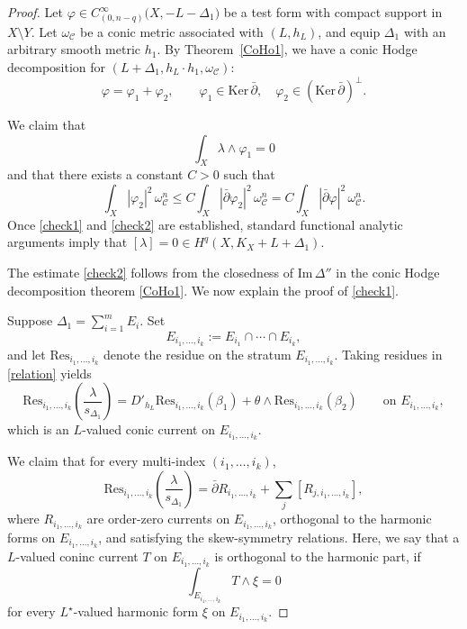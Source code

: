 \documentclass[english]{amsart}
\newcommand{\cC}{\mathcal{C}}
\newcommand{\im}{\mathrm{Im} \,}
\renewcommand{\ker}{\mathrm{Ker} \,}
\renewcommand{\le}{\leqslant}
\newcommand{\Res}{\mathrm{Res}}
\newcommand{\dbar}{\bar \partial}
\numberwithin{equation}{thm}
\begin{document}
			\begin{proof}
				Let $\varphi \in C^\infty_{(0,n-q)}\bigl(X,-L-\Delta_1\bigr)$ be a test form with compact support in $X\setminus Y$.
				Let $\omega_{\cC}$ be a conic metric associated with $(L,h_L)$, and equip $\Delta_1$ with an arbitrary smooth metric $h_1$.
				By Theorem~\ref{CoHo1}, we have a conic Hodge decomposition for $(L+\Delta_1, h_L\cdot h_1,\omega_{\cC})$:
				\begin{equation}\label{van3}
					\varphi=\varphi_1+\varphi_2,
					\qquad \varphi_1\in \ker \dbar,\quad \varphi_2\in (\ker \dbar)^\perp.
				\end{equation}
				
				\medskip
				
				We claim that
				\begin{equation}\label{check1}
					\int_X \lambda\wedge \varphi_1 = 0
				\end{equation}
				and that there exists a constant $C>0$ such that
				\begin{equation}\label{check2}
					\int_X |\varphi_2|^2 \,\omega_{\cC}^n
					\le C \int_X |\dbar \varphi_2|^2\,\omega_{\cC}^n
					= C \int_X |\dbar \varphi|^2\,\omega_{\cC}^n.
				\end{equation}
				Once \eqref{check1} and \eqref{check2} are established, standard functional analytic arguments imply that $[\lambda]=0 \in H^q(X,K_X+L+\Delta_1)$.
				
				\medskip
				
				The estimate \eqref{check2} follows from the closedness of $\im \Delta''$ in the conic Hodge decomposition theorem \ref{CoHo1}. 
				We now explain the proof of \eqref{check1}.
				
				Suppose $\Delta_1=\sum_{i=1}^m E_i$. Set
				\[
				E_{i_1,\dots,i_k}:=E_{i_1}\cap\cdots\cap E_{i_k},
				\]
				and let $\Res_{i_1,\dots,i_k}$ denote the residue on the stratum $E_{i_1,\dots,i_k}$.
				Taking residues in \eqref{relation} yields
				\begin{equation}\label{resiequl}
				\Res_{i_1,\dots,i_k}\!\left(\frac{\lambda}{s_{\Delta_1}}\right)
				= D'_{h_L}\Res_{i_1,\dots,i_k}(\beta_1)
				+ \theta \wedge \Res_{i_1,\dots,i_k}(\beta_2)
				\qquad \text{on } E_{i_1,\dots,i_k},
				\end{equation}
				which is an $L$-valued conic current on $E_{i_1,\dots,i_k}$.
				
				We claim that for every multi-index $(i_1,\dots,i_k)$,
				\begin{equation}\label{clima}
					\Res_{i_1,\dots,i_k}\!\left(\frac{\lambda}{s_{\Delta_1}}\right)
					= \dbar R_{i_1,\dots,i_k} + \sum_j [R_{j,i_1,\dots,i_k}],
				\end{equation}
				where $R_{i_1,\dots,i_k}$ are order-zero currents on $E_{i_1,\dots,i_k}$, orthogonal to the harmonic forms on $E_{i_1,\dots,i_k}$, and satisfying the skew-symmetry relations.  Here, we say that a $L$-valued coninc current $T$ on $E_{i_1,\dots,i_k}$ is orthogonal to the harmonic part, if 
				$$\int_{E_{i_1,\dots,i_k}} T \wedge \xi =0$$
				for every $L^\star$-valued harmonic form $\xi$ on $E_{i_1,\dots,i_k}$.
				

\end{proof}
\end{document}
